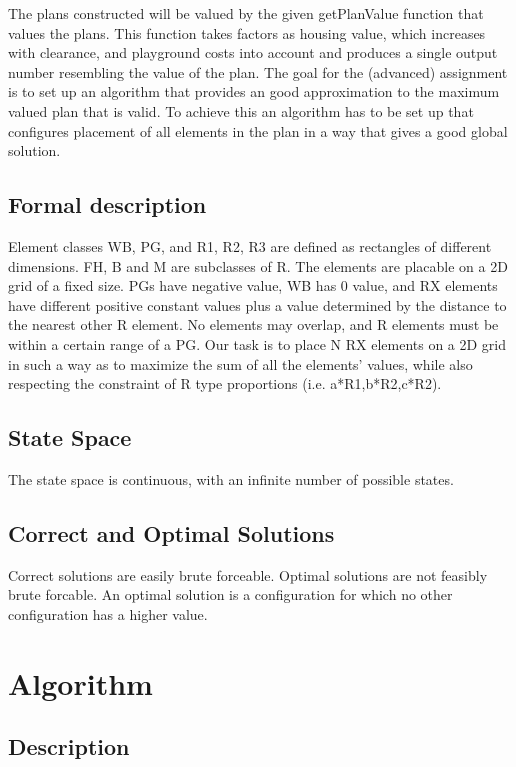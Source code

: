 \documentclass{article}
\begin{document}
The plans constructed will be valued by the given getPlanValue function that values the plans. This function takes factors as housing value, which increases with clearance, and playground costs into account and produces a single output number resembling the value of the plan. The goal for the (advanced) assignment is to set up an algorithm that provides an good approximation to the maximum valued plan that is valid. To achieve this an algorithm has to be set up that configures placement of all elements in the plan in a way that gives a good global solution.

\subsection{Formal description}

Element classes WB, PG, and R1, R2, R3 are defined as rectangles of different dimensions. FH, B and M are subclasses of R. The elements are placable on a 2D grid of a fixed size. PGs have negative value, WB has 0 value, and RX elements have different positive constant values plus a value determined by the distance to the nearest other R element. No elements may overlap, and R elements must be within a certain range of a PG. Our task is to place N RX elements on a 2D grid in such a way as to maximize the sum of all the elements' values, while also respecting the constraint of R type proportions (i.e. a*R1,b*R2,c*R2).

\subsection{State Space}

The state space is continuous, with an infinite number of possible states. 

\subsection{Correct and Optimal Solutions}

Correct solutions are easily brute forceable. Optimal solutions are not feasibly brute forcable. An optimal solution is a configuration for which no other configuration has a higher value. 

\section{Algorithm}

\subsection{Description}
\end{document}
